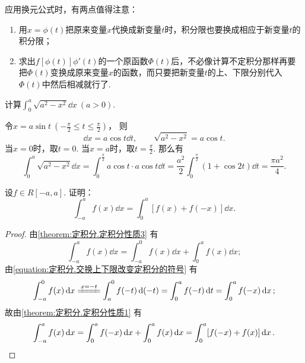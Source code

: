应用换元公式时，有两点值得注意：\begin{enumerate}
\item 用\(x = \phi(t)\)把原来变量\(x\)代换成新变量\(t\)时，积分限也要换成相应于新变量\(t\)的积分限；
\item 求出\(f[\phi(t)] \phi'(t)\)的一个原函数\(\Phi(t)\)后，不必像计算不定积分那样再要把\(\Phi(t)\)变换成原来变量\(x\)的函数，而只要把新变量\(t\)的上、下限分别代入\(\Phi(t)\)中然后相减就行了.
\end{enumerate}

\begin{example}
计算\(\int_0^a \sqrt{a^2-x^2} \dd{x}\ (a > 0)\).
\begin{solution}
令\(x = a \sin t\ (-\frac\pi2 \leq t \leq \frac\pi2)\)，
则\[
	\dd{x} = a \cos t \dd{t}, \qquad
	\sqrt{a^2-x^2} = a \cos t.
\]
当\(x = 0\)时，取\(t = 0\).
当\(x = a\)时，取\(t = \frac{\pi}{2}\).
那么有\[
	\int_0^a \sqrt{a^2-x^2} \dd{x}
	= \int_0^{\frac{\pi}{2}} a \cos t \cdot a \cos t \dd{t}
	= \frac{a^2}{2} \int_0^{\frac{\pi}{2}} (1+\cos 2 t) \dd{t}
	= \frac{\pi a^2}{4}.
\]
\end{solution}
\end{example}

\begin{proposition}\label{theorem:定积分.利用对称性简化计算0}
设\(f \in R[-a,a]\).
证明：\begin{equation}
	\int_{-a}^a f(x) \dd{x} = \int_0^a [f(x) + f(-x)] \dd{x}.
\end{equation}
\begin{proof}
由\cref{theorem:定积分.定积分性质3} 有\[
	\int_{-a}^a f(x) \dd{x}
	= \int_{-a}^0 f(x) \dd{x}
	+ \int_0^a f(x) \dd{x};
\]
由\cref{equation:定积分.交换上下限改变定积分的符号} 有\[
	\int_{-a}^0 f(x) \dd{x}
	\xlongequal{x=-t} \int_a^0 f(-t) \dd(-t)
	= \int_0^a f(-t) \dd{t}
	= \int_0^a f(-x) \dd{x};
\]
故由\cref{theorem:定积分.定积分性质1} 有\[
	\int_{-a}^a f(x) \dd{x}
	= \int_0^a f(-x) \dd{x} + \int_0^a f(x) \dd{x}
	= \int_0^a [f(-x) + f(x)] \dd{x}.
	\qedhere
\]
\end{proof}
\end{proposition}

